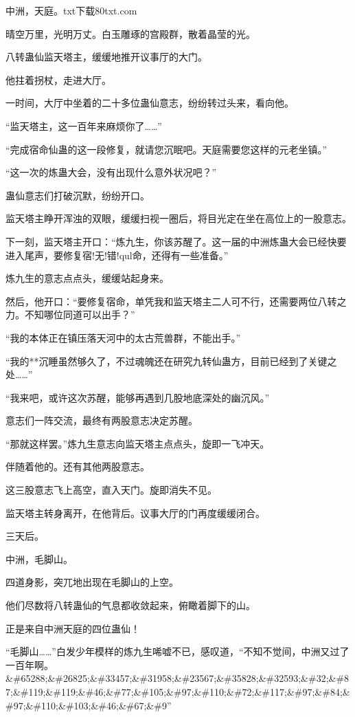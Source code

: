 
\begin{this_body}

中洲，天庭。txt下载80txt.com

晴空万里，光明万丈。白玉雕琢的宫殿群，散着晶莹的光。

八转蛊仙监天塔主，缓缓地推开议事厅的大门。

他拄着拐杖，走进大厅。

一时间，大厅中坐着的二十多位蛊仙意志，纷纷转过头来，看向他。

“监天塔主，这一百年来麻烦你了……”

“完成宿命仙蛊的这一段修复，就请您沉眠吧。天庭需要您这样的元老坐镇。”

“这一次的炼蛊大会，没有出现什么意外状况吧？”

蛊仙意志们打破沉默，纷纷开口。

监天塔主睁开浑浊的双眼，缓缓扫视一圈后，将目光定在坐在高位上的一股意志。

下一刻，监天塔主开口：“炼九生，你该苏醒了。这一届的中洲炼蛊大会已经快要进入尾声，要修复宿!无!错!qul命，还得有一些准备。”

炼九生的意志点点头，缓缓站起身来。

然后，他开口：“要修复宿命，单凭我和监天塔主二人可不行，还需要两位八转之力。不知哪位同道可以出手？”

“我的本体正在镇压落天河中的太古荒兽群，不能出手。”

“我的**沉睡虽然够久了，不过魂魄还在研究九转仙蛊方，目前已经到了关键之处……”

“我来吧，或许这次苏醒，能够再遇到几股地底深处的幽沉风。”

意志们一阵交流，最终有两股意志决定苏醒。

“那就这样罢。”炼九生意志向监天塔主点点头，旋即一飞冲天。

伴随着他的。还有其他两股意志。

这三股意志飞上高空，直入天门。旋即消失不见。

监天塔主转身离开，在他背后。议事大厅的门再度缓缓闭合。

三天后。

中洲，毛脚山。

四道身影，突兀地出现在毛脚山的上空。

他们尽数将八转蛊仙的气息都收敛起来，俯瞰着脚下的山。

正是来自中洲天庭的四位蛊仙！

“毛脚山……”白发少年模样的炼九生唏嘘不已，感叹道，“不知不觉间，中洲又过了一百年啊。\&\#65288;\&\#26825;\&\#33457;\&\#31958;\&\#23567;\&\#35828;\&\#32593;\&\#32;\&\#87;\&\#119;\&\#119;\&\#46;\&\#77;\&\#105;\&\#97;\&\#110;\&\#72;\&\#117;\&\#97;\&\#84;\&\#97;\&\#110;\&\#103;\&\#46;\&\#67;\&\#9”


\end{this_body}
